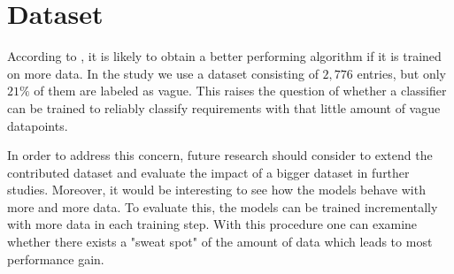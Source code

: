 \section{Dataset}
\label{chp:future_work:sec:dataset}
According to \textcite{Domingos:2012}, it is likely to obtain a better performing algorithm if it is trained on more data.
In the study we use a dataset consisting of $2,776$ entries, but only $21\%$ of them are labeled as vague.
This raises the question of whether a classifier can be trained to reliably classify requirements with that little amount of vague datapoints.

In order to address this concern, future research should consider to extend the contributed dataset and evaluate the impact of a bigger dataset in further studies.
Moreover, it would be interesting to see how the models behave with more and more data.
To evaluate this, the models can be trained incrementally with more data in each training step.
With this procedure one can examine whether there exists a "sweat spot" of the amount of data which leads to most performance gain.
